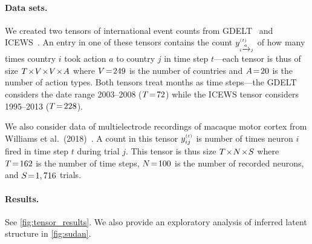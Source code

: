 \documentclass{article}
\begin{document}
\paragraph{Data sets.} We created two tensors of international event counts from GDELT~\cite{leetaru2013gdelt} and ICEWS~\cite{boscheeicews}. An entry in one of these tensors contains the count $y_{\mathsmaller{i \xrightarrow{a} j} }^{\mathsmaller{(t)}}$ of how many times country $i$ took action $a$ to country $j$ in time step $t$---each tensor is thus of size $T \!\times\! V \!\times\! V \!\times\! A$ where $V \!=\! 249$ is the number of countries and $A \!=\! 20$ is the number of action types. Both tensors treat months as time steps---the GDELT considers the date range 2003--2008 ($T \!=\! 72$) while the ICEWS tensor considers 1995--2013 ($T \!=\! 228$).~

We also consider data of multielectrode recordings of macaque motor cortex from Williams et al.~(2018)~\cite{williams2018unsupervised}. A count in this tensor $y^{\mathsmaller{(t)}}_{ij}$ is number of times neuron $i$ fired in time step $t$ during trial $j$. This tensor is thus size $T \!\times\! N \!\times\! S$ where $T \!=\! 162$ is the number of time steps, $N \!=\! 100$ is the number of recorded neurons, and $S \!=\! 1,716$ trials.

\paragraph{Results.} See \cref{fig:tensor_results}. We also provide an exploratory analysis of inferred latent structure in \cref{fig:sudan}.
\end{document}
